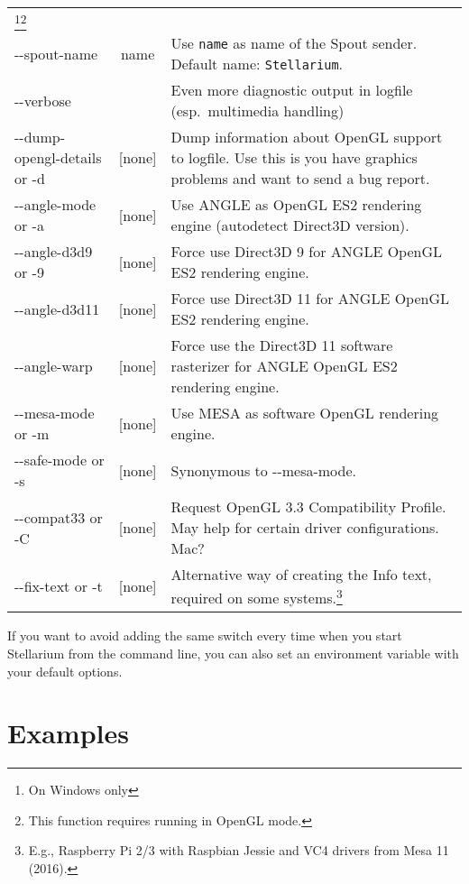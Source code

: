 \begin{longtable}{l|c|p{68mm}}
                                    \footnote{On Windows only}\footnote{This function requires running in OpenGL mode.}\\
-\/-spout-name       & name       & Use \texttt{name} as name of the Spout sender. Default name: \texttt{Stellarium}.\footnotemark[1]\\\midrule									
-\/-verbose          &            & Even more diagnostic output in logfile (esp.\ multimedia handling)\\
-\/-dump-opengl-details or -d     & {[}none{]} & Dump information about OpenGL support to logfile. 
                                                 Use this is you have graphics problems and want to send a bug report. \\\midrule
-\/-angle-mode or -a & {[}none{]} & Use ANGLE as OpenGL ES2 rendering engine (autodetect Direct3D version).\footnotemark[1]\\
-\/-angle-d3d9 or -9 & {[}none{]} & Force use Direct3D 9 for ANGLE OpenGL ES2 rendering engine.\footnotemark[1]\\
-\/-angle-d3d11      & {[}none{]} & Force use Direct3D 11 for ANGLE OpenGL ES2 rendering engine.\footnotemark[1]\\
-\/-angle-warp       & {[}none{]} & Force use the Direct3D 11 software rasterizer for ANGLE OpenGL ES2 rendering engine.\footnotemark[1]\\
-\/-mesa-mode or -m  & {[}none{]} & Use MESA as software OpenGL rendering engine.\footnotemark[1]\\
-\/-safe-mode or -s  & {[}none{]} & Synonymous to -\/-mesa-mode.\footnotemark[1]\\
-\/-compat33 or -C   & {[}none{]} & Request OpenGL 3.3 Compatibility Profile. May help for certain driver configurations. Mac?\\
-\/-fix-text or -t   & {[}none{]} & Alternative way of creating the Info text, required on some systems.\footnote{E.g., Raspberry Pi 2/3 with Raspbian Jessie and VC4 drivers from Mesa 11 (2016).}\\\bottomrule
\end{longtable}

\noindent {} If you want to avoid adding the same
switch every time when you start Stellarium from the command line, you
can also set an environment variable  with your
default options. 

\section{Examples}
\label{sec:CommandLineOptions:Examples}

